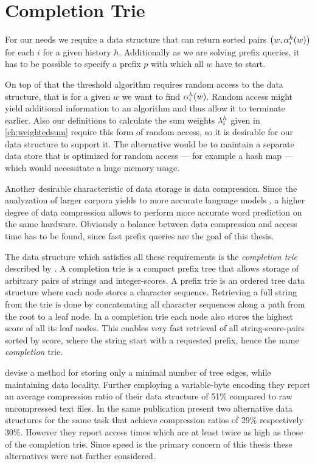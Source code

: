 \section{Completion Trie}
\label{sec:completiontrie}

For our needs we require a data structure that can return sorted pairs
$\left(w, \alpha^h_i(w)\right)$ for each $i$ for a given history $h$.
Additionally as we are solving prefix queries, it has to be possible to specify
a prefix $p$ with which all $w$ have to start.

On top of that the threshold algorithm requires random access to the data
structure, that is for a given $w$ we want to find $\alpha^h_i(w)$.
Random access might yield additional information to an algorithm and thus allow
it to terminate earlier.
Also our definitions to calculate the sum weights $\lambda^h_i$ given in
\cref{ch:weightedsum} require this form of random access, so it is desirable for
our data structure to support it.
The alternative would be to maintain a separate data store that is optimized for
random access --- for example a hash map --- which would necessitate a huge
memory usage.

Another desirable characteristic of data storage is data compression.
Since the analyzation of larger corpora yields to more accurate language models
\noref, a higher degree of data compression allows to perform more accurate
word prediction on the same hardware.
Obviously a balance between data compression and access time has to be found,
since fast prefix queries are the goal of this thesis.

The data structure which satisfies all these requirements is the
\emph{completion trie} described by \textcite{HsuOttaviano2013}.
A completion trie is a compact prefix tree that allows storage of arbitrary
pairs of strings and integer-scores.
A prefix trie is an ordered tree data structure where each node stores a
character sequence.
Retrieving a full string from the trie is done by concatenating all character
sequences along a path from the root to a leaf node.
In a completion trie each node also stores the highest score of all its leaf
nodes.
This enables very fast retrieval of all string-score-pairs sorted by score,
where the string start with a requested prefix, hence the name
\emph{completion} trie.

\textcite{HsuOttaviano2013} devise a method for storing only a minimal number of
tree edges, while maintaining data locality.
Further employing a variable-byte encoding they report an average compression
ratio of their data structure of 51\% compared to raw uncompressed text files.
In the same publication \textcite{HsuOttaviano2013} present two alternative
data structures for the same task that achieve compression ratios of 29\%
respectively 30\%.
However they report access times which are at least twice as high as those
of the completion trie.
Since speed is the primary concern of this thesis these alternatives
were not further considered.

